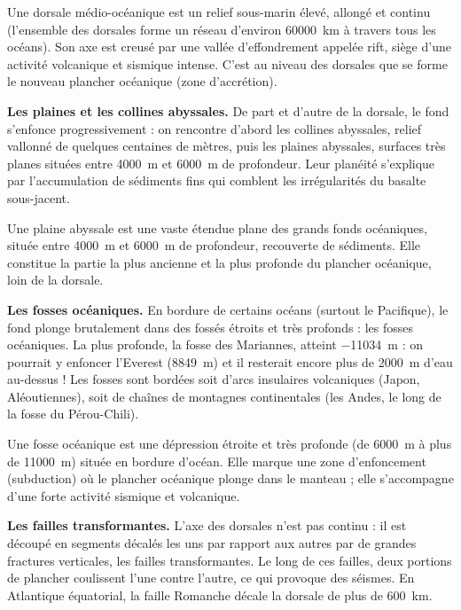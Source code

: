 \documentclass[11pt]{article}
\newcommand{\cle}[1]{{\popxbold\color{popdark}#1}}
\begin{document}
\begin{definition}
Une \cle{dorsale médio-océanique} est un relief sous-marin élevé, allongé et continu (l'ensemble des dorsales forme un réseau d'environ \SI{60000}{km} à travers tous les océans). Son axe est creusé par une vallée d'effondrement appelée \cle{rift}, siège d'une activité volcanique et sismique intense. C'est au niveau des dorsales que se forme le nouveau plancher océanique (zone d'\cle{accrétion}).
\end{definition}

\textbf{Les plaines et les collines abyssales.} De part et d'autre de la dorsale, le fond s'enfonce progressivement : on rencontre d'abord les \cle{collines abyssales}, relief vallonné de quelques centaines de mètres, puis les \cle{plaines abyssales}, surfaces très planes situées entre \SI{4000}{m} et \SI{6000}{m} de profondeur. Leur planéité s'explique par l'accumulation de sédiments fins qui comblent les irrégularités du basalte sous-jacent.

\begin{definition}
Une \cle{plaine abyssale} est une vaste étendue plane des grands fonds océaniques, située entre \SI{4000}{m} et \SI{6000}{m} de profondeur, recouverte de sédiments. Elle constitue la partie la plus ancienne et la plus profonde du plancher océanique, loin de la dorsale.
\end{definition}

\textbf{Les fosses océaniques.} En bordure de certains océans (surtout le Pacifique), le fond plonge brutalement dans des fossés étroits et très profonds : les \cle{fosses océaniques}. La plus profonde, la fosse des Mariannes, atteint \SI{-11034}{m} : on pourrait y enfoncer l'Everest (\SI{8849}{m}) et il resterait encore plus de \SI{2000}{m} d'eau au-dessus ! Les fosses sont bordées soit d'\cle{arcs insulaires} volcaniques (Japon, Aléoutiennes), soit de \cle{chaînes de montagnes continentales} (les Andes, le long de la fosse du Pérou-Chili).

\begin{definition}
Une \cle{fosse océanique} est une dépression étroite et très profonde (de \SI{6000}{m} à plus de \SI{11000}{m}) située en bordure d'océan. Elle marque une zone d'\cle{enfoncement} (subduction) où le plancher océanique plonge dans le manteau ; elle s'accompagne d'une forte activité sismique et volcanique.
\end{definition}

\textbf{Les failles transformantes.} L'axe des dorsales n'est pas continu : il est découpé en segments décalés les uns par rapport aux autres par de grandes fractures verticales, les \cle{failles transformantes}. Le long de ces failles, deux portions de plancher coulissent l'une contre l'autre, ce qui provoque des séismes. En Atlantique équatorial, la faille Romanche décale la dorsale de plus de \SI{600}{km}.
\end{document}
